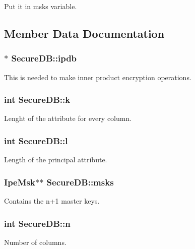 Put it in msks variable. 

\subsection{Member Data Documentation}
\subsubsection[{\texorpdfstring{ipdb}{ipdb}}]{$\ast$ Secure\+D\+B\+::ipdb}\hypertarget{classSecureDB_a56b13795575a382f7a3a263d2e79a4ab}{}\label{classSecureDB_a56b13795575a382f7a3a263d2e79a4ab}
This is needed to make inner product encryption operations. 
\subsubsection[{\texorpdfstring{k}{k}}]{\setlength{\rightskip}{0pt plus 5cm}int Secure\+D\+B\+::k}\hypertarget{classSecureDB_a1c0171e735bb38a78af19fb5b530557a}{}\label{classSecureDB_a1c0171e735bb38a78af19fb5b530557a}
Lenght of the attribute for every column. 
\subsubsection[{\texorpdfstring{l}{l}}]{\setlength{\rightskip}{0pt plus 5cm}int Secure\+D\+B\+::l}\hypertarget{classSecureDB_ab8f7de0f939b03278cabc7d9c4d248df}{}\label{classSecureDB_ab8f7de0f939b03278cabc7d9c4d248df}
Length of the principal attribute. 
\subsubsection[{\texorpdfstring{msks}{msks}}]{\setlength{\rightskip}{0pt plus 5cm}Ipe\+Msk$\ast$$\ast$ Secure\+D\+B\+::msks}\hypertarget{classSecureDB_a7c64d61dc130f025e769937a0303e301}{}\label{classSecureDB_a7c64d61dc130f025e769937a0303e301}
Contains the n+1 master keys. 
\subsubsection[{\texorpdfstring{n}{n}}]{\setlength{\rightskip}{0pt plus 5cm}int Secure\+D\+B\+::n}\hypertarget{classSecureDB_ae034772516922899c09a0e2790dac008}{}\label{classSecureDB_ae034772516922899c09a0e2790dac008}
Number of columns. 
